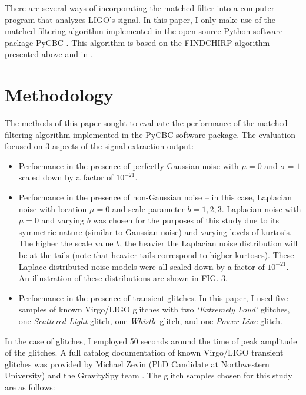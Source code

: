 \documentclass[reprint,
letterpaper,
 amsmath,amssymb,
 aps,
]{revtex4-2}
\begin{document}
There are several ways of incorporating the matched filter into a computer program that analyzes LIGO's signal. In this paper, I only make use of the matched filtering algorithm implemented in the open-source Python software package PyCBC \cite{pycbc}. This algorithm is based on the FINDCHIRP algorithm presented above and in \cite{findchirp}.


\section{Methodology}

The methods of this paper sought to evaluate the performance of the matched filtering algorithm implemented in the PyCBC software package. The evaluation focused on 3 aspects of the signal extraction output:
\begin{itemize}
    \item Performance in the presence of perfectly Gaussian noise with $\mu = 0$  and $\sigma = 1$ scaled down by a factor of $10^{-21}$.
    \item Performance in the presence of non-Gaussian noise – in this case, Laplacian noise with location $\mu = 0$ and scale parameter $b = 1,2,3$. Laplacian noise with  $\mu = 0$ and varying $b$ was chosen for the purposes of this study due to its symmetric nature (similar to Gaussian noise) and varying levels of kurtosis. The higher the scale value $b$, the heavier the Laplacian noise distribution will be at the tails (note that heavier tails correspond to higher kurtoses). These Laplace distributed noise models were all scaled down by a factor of $10^{-21}$. An illustration of these distributions are shown in FIG. 3.
    \item Performance in the presence of transient glitches. In this paper, I used five samples of known Virgo/LIGO glitches with two \textit{`Extremely Loud'} glitches, one \textit{Scattered Light} glitch, one \textit{Whistle} glitch, and one \textit{Power Line} glitch.

\end{itemize}

In the case of glitches, I employed 50 seconds around the time of peak amplitude of the glitches. A full catalog documentation of known Virgo/LIGO transient glitches was provided by Michael Zevin (PhD Candidate at Northwestern University) and the GravitySpy team \cite{gravityspy}.  The glitch samples chosen for this study are as follows:
\end{document}
